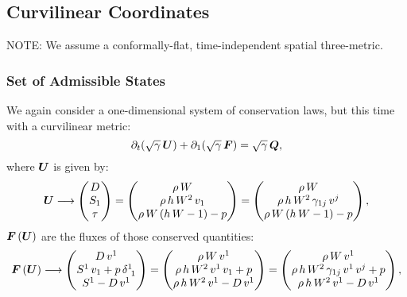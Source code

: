 \documentclass[10pt,preprint]{aastex}
\begin{document}
\newpage


\subsection{Curvilinear Coordinates}
NOTE: We assume a conformally-flat, time-independent spatial three-metric.

\subsubsection{Set of Admissible States}
We again consider a one-dimensional system of conservation laws, but this time with a curvilinear metric:
\begin{equation}
    \pd{\left(\sqrtgm\,\bU\right)}{t}+\pd{\left(\sqrtgm\,\bF\right)}{1}=\sqrtgm\,\bQ,
\end{equation}
where $\bU$ is given by:
\begin{equation}
    \bU\longrightarrow\begin{pmatrix} D\\ S_{1}\\ \tau\end{pmatrix}=\begin{pmatrix} \rho\,W\\ \rho\,h\,W^{2}\,v_{1}\\ \rho\,W\left(h\,W-1\right)-p\end{pmatrix}=\begin{pmatrix} \rho\,W\\ \rho\,h\,W^{2}\,\gamma_{1j}\,v^{j}\\ \rho\,W\left(h\,W-1\right)-p\end{pmatrix},
\end{equation}
$\bF\left(\bU\right)$ are the fluxes of those conserved quantities:
\begin{equation}
    \bF\left(\bU\right)\longrightarrow\begin{pmatrix}D\,v^{1}\\ S^{1}\,v_{1}+p\,\delta^{1}_{~1}\\ S^{1}-D\,v^{1}\end{pmatrix}=\begin{pmatrix}\rho\,W\,v^{1}\\ \rho\,h\,W^{2}\,v^{1}\,v_{1}+p\\\rho\,h\,W^{2}\,v^{1}-D\,v^{1}\end{pmatrix}=\begin{pmatrix}\rho\,W\,v^{1}\\ \rho\,h\,W^{2}\,\gamma_{1j}\,v^{1}\,v^{j}+p\\\rho\,h\,W^{2}\,v^{1}-D\,v^{1}\end{pmatrix},
\end{equation}
\end{document}
